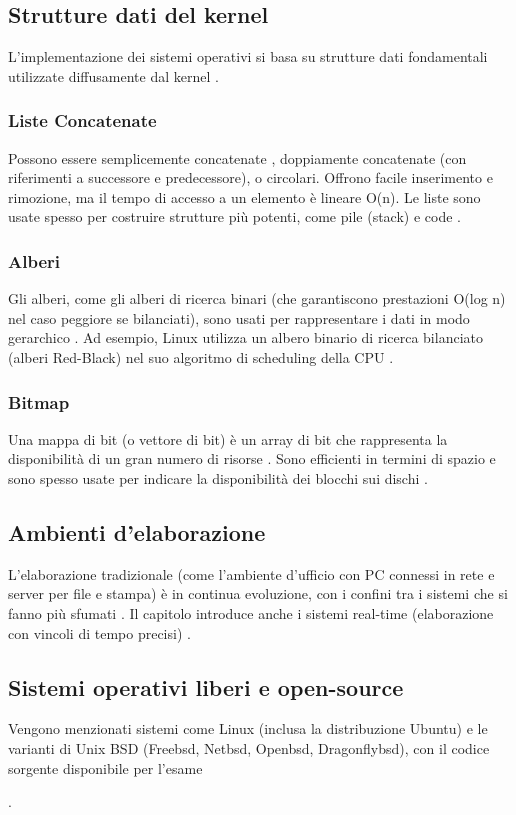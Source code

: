 \documentclass[12pt,a4paper, openany]{book}
\begin{document}
\begin{small}
		\subsection{Strutture dati del kernel} L'implementazione dei sistemi operativi si basa su strutture dati fondamentali utilizzate diffusamente dal kernel
		.
		\subsubsection{Liste Concatenate} Possono essere semplicemente concatenate
		, doppiamente concatenate (con riferimenti a successore e predecessore), o circolari. Offrono facile inserimento e rimozione, ma il tempo di accesso a un elemento è lineare O(n). Le liste sono usate spesso per costruire strutture più potenti, come pile (stack) e code
		.
		\subsubsection{Alberi} Gli alberi, come gli alberi di ricerca binari (che garantiscono prestazioni O(log n) nel caso peggiore se bilanciati), sono usati per rappresentare i dati in modo gerarchico
		. Ad esempio, Linux utilizza un albero binario di ricerca bilanciato (alberi Red-Black) nel suo algoritmo di scheduling della CPU
		.
		\subsubsection{Bitmap} Una mappa di bit (o vettore di bit) è un array di bit che rappresenta la disponibilità di un gran numero di risorse
		. Sono efficienti in termini di spazio e sono spesso usate per indicare la disponibilità dei blocchi sui dischi
		.
		\subsection{Ambienti d’elaborazione} L'elaborazione tradizionale (come l'ambiente d'ufficio con PC connessi in rete e server per file e stampa) è in continua evoluzione, con i confini tra i sistemi che si fanno più sfumati
		. Il capitolo introduce anche i sistemi real-time (elaborazione con vincoli di tempo precisi)
		.
		\subsection{Sistemi operativi liberi e open-source} Vengono menzionati sistemi come Linux (inclusa la distribuzione Ubuntu) e le varianti di Unix BSD (Freebsd, Netbsd, Openbsd, Dragonflybsd), con il codice sorgente disponibile per l'esame
		
		. \end{small}
	
\end{document}
